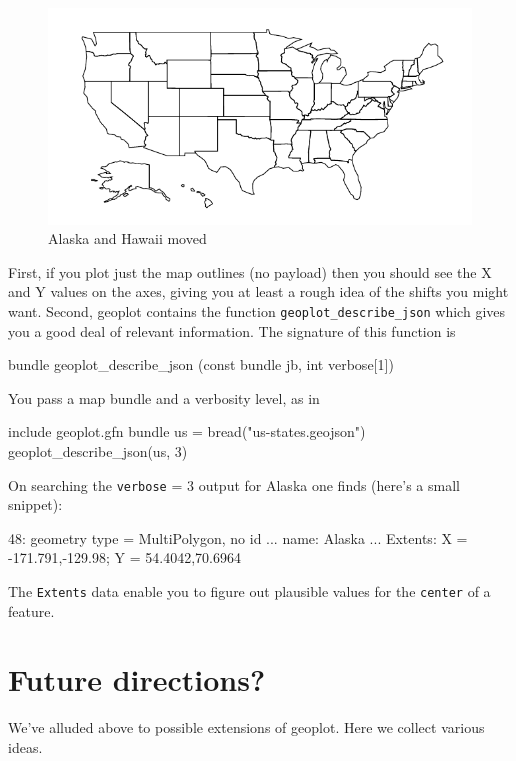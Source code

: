 \documentclass{article}
\begin{document}
\begin{figure}[p]
  \centering
  \includegraphics{usmod.pdf}
  \caption{Alaska and Hawaii moved}
  \label{fig:usmod}
\end{figure}

First, if you plot just the map outlines (no payload) then you should
see the X and Y values on the axes, giving you at least a rough idea
of the shifts you might want. Second, \textsf{geoplot} contains the
function \texttt{geoplot\_describe\_json} which gives you a good deal
of relevant information. The signature of this function is
\begin{code}
bundle geoplot_describe_json (const bundle jb, int verbose[1])
\end{code}
You pass a map bundle and a verbosity level, as in
\begin{code}
include geoplot.gfn
bundle us = bread("us-states.geojson")
geoplot_describe_json(us, 3)
\end{code}
On searching the \texttt{verbose} = 3 output for Alaska one finds
(here's a small snippet):
\begin{code}
  48: geometry type = MultiPolygon, no id
        ...
        name: Alaska
        ...
        Extents: X = {-171.791,-129.98}; Y = {54.4042,70.6964}
\end{code}
The \texttt{Extents} data enable you to figure out plausible
values for the \texttt{center} of a feature.

\section{Future directions?}
\label{sec:future}

We've alluded above to possible extensions of \textsf{geoplot}. Here
we collect various ideas.
\end{document}
